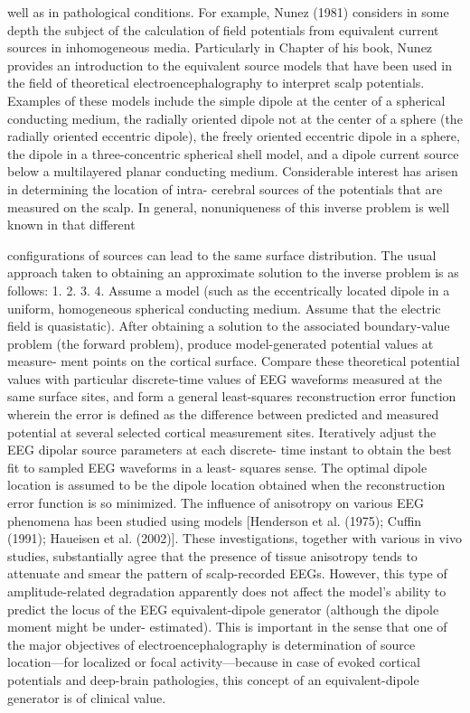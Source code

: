 well as in pathological conditions. For example, Nunez (1981) considers in
some depth the subject of the calculation of field potentials from equivalent
current sources in inhomogeneous media. Particularly in Chapter of his book,
Nunez provides an introduction to the equivalent source models that have
been used in the field of theoretical electroencephalography to interpret scalp
potentials. Examples of these models include the simple dipole at the center of
a spherical conducting medium, the radially oriented dipole not at the center of
a sphere (the radially oriented eccentric dipole), the freely oriented eccentric
dipole in a sphere, the dipole in a three-concentric spherical shell model, and a
dipole current source below a multilayered planar conducting medium.
Considerable interest has arisen in determining the location of intra-
cerebral sources of the potentials that are measured on the scalp. In general,
nonuniqueness of this inverse problem is well known in that different

configurations of sources can lead to the same surface distribution. The usual
approach taken to obtaining an approximate solution to the inverse problem is
as follows:
1.
2.
3.
4.
Assume a model (such as the eccentrically located dipole in a uniform,
homogeneous spherical conducting medium. Assume that the electric
field is quasistatic).
After obtaining a solution to the associated boundary-value problem (the
forward problem), produce model-generated potential values at measure-
ment points on the cortical surface.
Compare these theoretical potential values with particular discrete-time
values of EEG waveforms measured at the same surface sites, and form a
general least-squares reconstruction error function wherein the error is
defined as the difference between predicted and measured potential at
several selected cortical measurement sites.
Iteratively adjust the EEG dipolar source parameters at each discrete-
time instant to obtain the best fit to sampled EEG waveforms in a least-
squares sense. The optimal dipole location is assumed to be the dipole
location obtained when the reconstruction error function is so minimized.
The influence of anisotropy on various EEG phenomena has been studied
using models [Henderson et al. (1975); Cuffin (1991); Haueisen et al. (2002)].
These investigations, together with various in vivo studies, substantially agree
that the presence of tissue anisotropy tends to attenuate and smear the pattern
of scalp-recorded EEGs. However, this type of amplitude-related degradation
apparently does not affect the model’s ability to predict the locus of the EEG
equivalent-dipole generator (although the dipole moment might be under-
estimated). This is important in the sense that one of the major objectives of
electroencephalography is determination of source location—for localized or
focal activity—because in case of evoked cortical potentials and deep-brain
pathologies, this concept of an equivalent-dipole generator is of clinical value.

